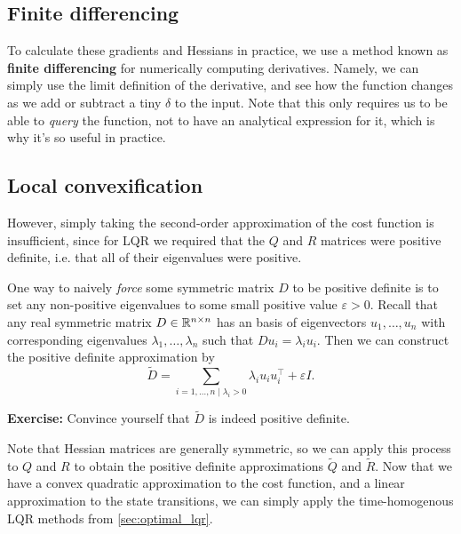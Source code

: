 \documentclass[../main/main]{subfiles}
\begin{document}
\subsection{Finite differencing}

To calculate these gradients and Hessians in practice,
we use a method known as \textbf{finite differencing} for numerically computing derivatives.
Namely, we can simply use the limit definition of the derivative,
and see how the function changes as we add or subtract a tiny $\delta$ to the input.
Note that this only requires us to be able to \emph{query} the function, not to have an analytical expression for it,
which is why it's so useful in practice.

\subsection{Local convexification}

However, simply taking the second-order approximation of the cost function is insufficient,
since for LQR we required that the $Q$ and $R$ matrices were positive definite, i.e. that all of their eigenvalues were positive.

One way to naively \emph{force} some symmetric matrix $D$ to be positive definite is to set any non-positive eigenvalues to some small positive value $\varepsilon > 0$.
Recall that any real symmetric matrix $D \in \mathbb{R}^{n \times n}$ has an basis of eigenvectors $u_1, \dots, u_n$ with corresponding eigenvalues $\lambda_1, \dots, \lambda_n$ such that $D u_i = \lambda_i u_i$. Then we can construct the positive definite approximation by \[
    \widetilde{D} = \sum_{i=1, \dots, n \mid \lambda_i > 0} \lambda_i u_i u_i^\top + \varepsilon I.
\]

\textbf{Exercise:} Convince yourself that $\widetilde{D}$ is indeed positive definite.

Note that Hessian matrices are generally symmetric, so we can apply this process to $Q$ and $R$ to obtain the positive definite approximations $\widetilde{Q}$ and $\widetilde{R}$. Now that we have a convex quadratic approximation to the cost function, and a linear approximation to the state transitions, we can simply apply the time-homogenous LQR methods from \autoref{sec:optimal_lqr}.

\end{document}
